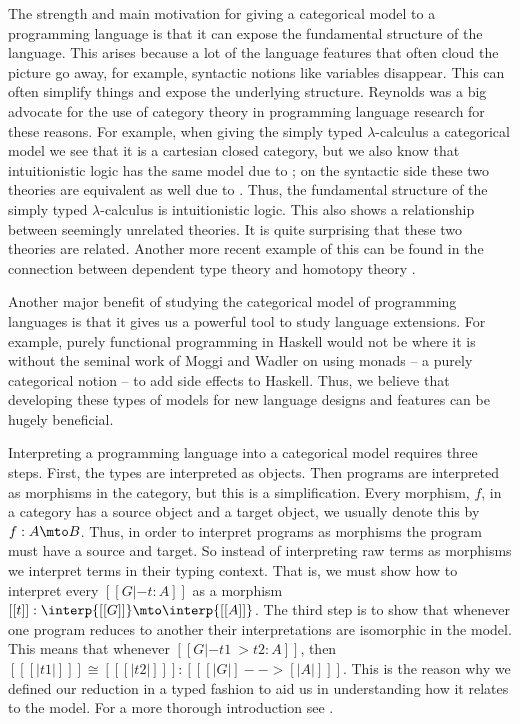 The strength and main motivation for giving a categorical model to a
programming language is that it can expose the fundamental structure
of the language.  This arises because a lot of the language features
that often cloud the picture go away, for example, syntactic notions
like variables disappear.  This can often simplify things and expose
the underlying structure.  Reynolds \cite{?} was a big advocate for
the use of category theory in programming language research for these
reasons.  For example, when giving the simply typed $\lambda$-calculus
a categorical model we see that it is a cartesian closed category, but
we also know that intuitionistic logic has the same model due to
\cite{Lambek:1980}; on the syntactic side these two theories are
equivalent as well due to \cite{Howard:1980}. Thus, the fundamental
structure of the simply typed $\lambda$-calculus is intuitionistic
logic.  This also shows a relationship between seemingly unrelated
theories.  It is quite surprising that these two theories are related.
Another more recent example of this can be found in the connection
between dependent type theory and homotopy theory \cite{??}.

Another major benefit of studying the categorical model of programming
languages is that it gives us a powerful tool to study language
extensions.  For example, purely functional programming in Haskell
would not be where it is without the seminal work of Moggi and Wadler
\cite{??}  on using monads -- a purely categorical notion -- to add
side effects to Haskell.  Thus, we believe that developing these types
of models for new language designs and features can be hugely
beneficial.

Interpreting a programming language into a categorical model requires
three steps.  First, the types are interpreted as objects.  Then
programs are interpreted as morphisms in the category, but this is a
simplification.  Every morphism, $f$, in a category has a source
object and a target object, we usually denote this by $f : A \mto B$.
Thus, in order to interpret programs as morphisms the program must
have a source and target.  So instead of interpreting raw terms as
morphisms we interpret terms in their typing context.  That is, we
must show how to interpret every $[[G |- t : A]]$ as a morphism $[[t]]
: \interp{[[G]]} \mto \interp{[[A]]}$.  The third step is to show that
whenever one program reduces to another their interpretations are
isomorphic in the model. This means that whenever $[[G |- t1 ~> t2 :
    A]]$, then $[[ [|t1|] ]] \cong [[ [|t2|] ]] : [[ [| G |] --> [| A
      |] ]]$.  This is the reason why we defined our reduction in a
typed fashion to aid us in understanding how it relates to the model.
For a more thorough introduction see \cite{Crole:1994}.

